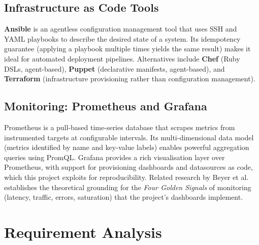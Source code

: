 \documentclass[12pt,a4paper]{report}
\begin{document}
\section{Infrastructure as Code Tools}
\textbf{Ansible} \cite{ansible_docs} is an agentless configuration management tool that uses SSH and YAML playbooks to describe the desired state of a system. Its idempotency guarantee (applying a playbook multiple times yields the same result) makes it ideal for automated deployment pipelines. Alternatives include \textbf{Chef} (Ruby DSLs, agent-based), \textbf{Puppet} (declarative manifests, agent-based), and \textbf{Terraform} (infrastructure provisioning rather than configuration management).

\section{Monitoring: Prometheus and Grafana}
Prometheus \cite{prometheus_docs} is a pull-based time-series database that scrapes metrics from instrumented targets at configurable intervals. Its multi-dimensional data model (metrics identified by name and key-value labels) enables powerful aggregation queries using PromQL. Grafana \cite{grafana_docs} provides a rich visualisation layer over Prometheus, with support for provisioning dashboards and datasources as code, which this project exploits for reproducibility. Related research by Beyer et al. \cite{beyer2016sre} establishes the theoretical grounding for the \textit{Four Golden Signals} of monitoring (latency, traffic, errors, saturation) that the project's dashboards implement.

\chapter{Requirement Analysis}
\end{document}
